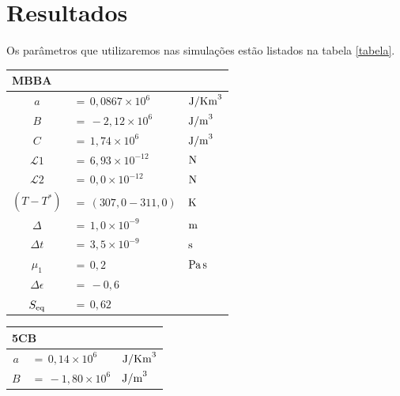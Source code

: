 \hypertarget{cap2}{}
\chapter{Resultados}

Os parâmetros que utilizaremos nas simulações estão listados na tabela
\ref{tabela}.
\begin{table}[!htb]
	\begin{minipage}[b]{0.49\linewidth}
	  \begin{center}
	    \begin{tabular}{c l l}
	\multicolumn{3}{l}{MBBA} \\ 
	\hline 
	\hline 
	$a$               & $= \, 0,0867 \times 10^{6}$   & ${\rm J/Km}^{3}$ \\
	$B$               & $= \, -2,12  \times 10^{6}$   & ${\rm J/m}^{3}$  \\
	$C$               & $= \, 1,74   \times 10^{6}$   & ${\rm J/m}^{3}$  \\
	$\mathcal{L}1$    & $= \, 6,93   \times 10^{-12}$ & ${\rm N}$        \\
	$\mathcal{L}2$    & $= \, 0,0    \times 10^{-12}$ & ${\rm N}$        \\
	$(T-T^{*})$       & $= \, (307,0- 311,0)$         & ${\rm K}$        \\
	$\Delta$          & $= \, 1,0    \times 10^{-9}$  & ${\rm m}$        \\
	$\Delta t$        & $= \, 3,5    \times 10^{-9}$  & ${\rm s}$        \\
	$\mu_1$           & $= \, 0,2 $                   & ${\rm Pa\, s}$   \\
	$\Delta \epsilon$ & $= \, -0,6$                   &                  \\
	$S_{\rm eq}$      & $= \, 0,62$                   &                  \\
	\hline
	    \end{tabular}
	  \end{center}
	\end{minipage}
	\begin{minipage}[b]{0.49\linewidth}
	  \begin{center}
	    \begin{tabular}{c l l}
	\multicolumn{3}{l}{5CB} \\ 
	\hline
	\hline 
	$a$               & $= \, 0,14  \times 10^{6}$   & ${\rm J/Km}^{3}$ \\
	$B$               & $= \, -1,80 \times 10^{6}$   & ${\rm J/m}^{3}$  \\

\end{tabular}
\end{center}
\end{minipage}
\end{table}
